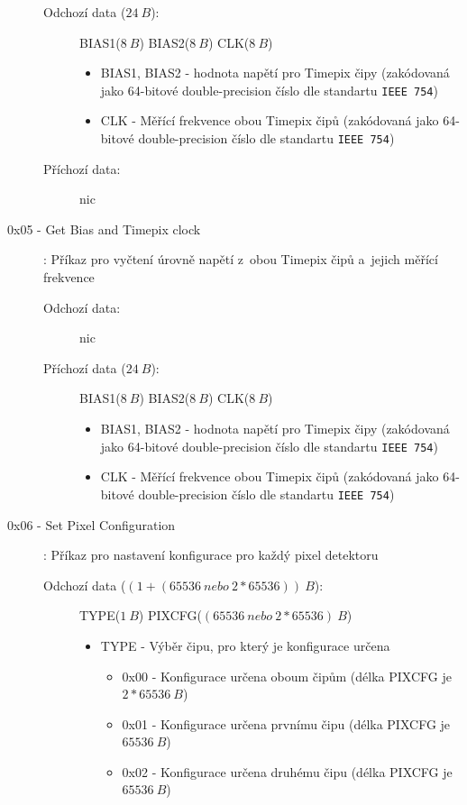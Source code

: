 \begin{description}
		\begin{description}
			\item[Odchozí data ($24~B$):] BIAS1($8~B$) BIAS2($8~B$) CLK($8~B$)
				\begin{itemize}
					\item BIAS1, BIAS2 - hodnota napětí pro Timepix čipy (zakódovaná jako 64-bitové double-precision číslo dle standartu \texttt{IEEE 754})
					\item CLK - Měřící frekvence obou Timepix čipů (zakódovaná jako 64-bitové double-precision číslo dle standartu \texttt{IEEE 754})
				\end{itemize}
			\item[Příchozí data:] nic
		\end{description}
	\item[0x05 - Get Bias and Timepix clock]:
		Příkaz pro vyčtení úrovně napětí z~obou Timepix čipů a~jejich měřící frekvence
		\begin{description}
			\item[Odchozí data:] nic
			\item[Příchozí data ($24~B$):] BIAS1($8~B$) BIAS2($8~B$) CLK($8~B$)
				\begin{itemize}
					\item BIAS1, BIAS2 - hodnota napětí pro Timepix čipy (zakódovaná jako 64-bitové double-precision číslo dle standartu \texttt{IEEE 754})
					\item CLK - Měřící frekvence obou Timepix čipů (zakódovaná jako 64-bitové double-precision číslo dle standartu \texttt{IEEE 754})
				\end{itemize}
		\end{description}
	\item[0x06 - Set Pixel Configuration]:
		Příkaz pro nastavení konfigurace pro každý pixel detektoru
		\begin{description}
			\item[Odchozí data ($(1+(65536~nebo~2*65536))~B$):] TYPE($1~B$) PIXCFG($(65536~nebo~2*65536)~B$)
				\begin{itemize}
					\item TYPE - Výběr čipu, pro který je konfigurace určena
						\begin{itemize}
							\item 0x00 - Konfigurace určena oboum čipům (délka PIXCFG je $2*65536~B$)
							\item 0x01 - Konfigurace určena prvnímu čipu (délka PIXCFG je $65536~B$)
							\item 0x02 - Konfigurace určena druhému čipu (délka PIXCFG je $65536~B$)

\end{itemize}
\end{itemize}
\end{description}
\end{description}

